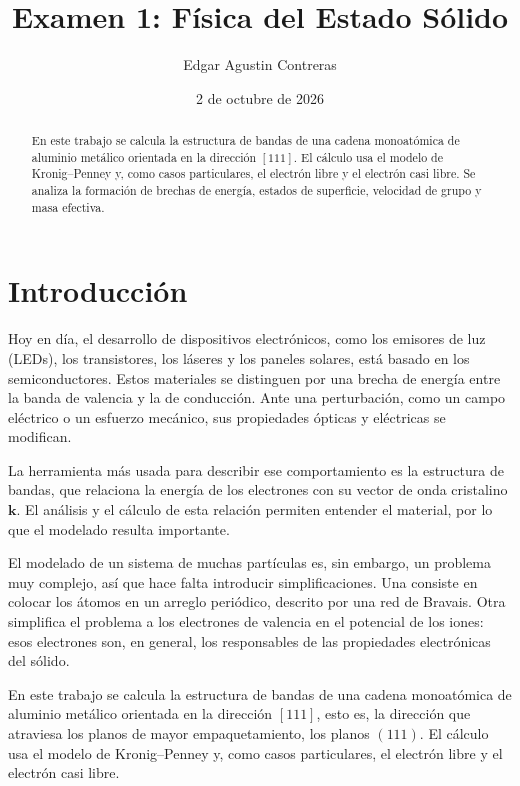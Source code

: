 \documentclass[reprint, amsmath, amssymb, aps, prb]{revtex4-2}
\begin{document}
\title{Examen 1: Física del Estado Sólido}
\author{Edgar Agustin Contreras}
\date{2 de octubre de 2026}

\begin{abstract}
En este trabajo se calcula la estructura de bandas de una cadena monoatómica de aluminio metálico orientada en la dirección $[111]$. El cálculo usa el modelo de Kronig--Penney y, como casos particulares, el electrón libre y el electrón casi libre. Se analiza la formación de brechas de energía, estados de superficie, velocidad de grupo y masa efectiva.
\end{abstract}

\maketitle

\section{Introducción}

Hoy en día, el desarrollo de dispositivos electrónicos, como los emisores de luz (LEDs), los transistores, los láseres y los paneles solares, está basado en los semiconductores. Estos materiales se distinguen por una brecha de energía entre la banda de valencia y la de conducción. Ante una perturbación, como un campo eléctrico o un esfuerzo mecánico, sus propiedades ópticas y eléctricas se modifican.

La herramienta más usada para describir ese comportamiento es la estructura de bandas, que relaciona la energía de los electrones con su vector de onda cristalino $\mathbf{k}$. El análisis y el cálculo de esta relación permiten entender el material, por lo que el modelado resulta importante.

El modelado de un sistema de muchas partículas es, sin embargo, un problema muy complejo, así que hace falta introducir simplificaciones. Una consiste en colocar los átomos en un arreglo periódico, descrito por una red de Bravais. Otra simplifica el problema a los electrones de valencia en el potencial de los iones: esos electrones son, en general, los responsables de las propiedades electrónicas del sólido.

En este trabajo se calcula la estructura de bandas de una cadena monoatómica de aluminio metálico orientada en la dirección $[111]$, esto es, la dirección que atraviesa los planos de mayor empaquetamiento, los planos $(111)$. El cálculo usa el modelo de Kronig--Penney y, como casos particulares, el electrón libre y el electrón casi libre.
\end{document}
